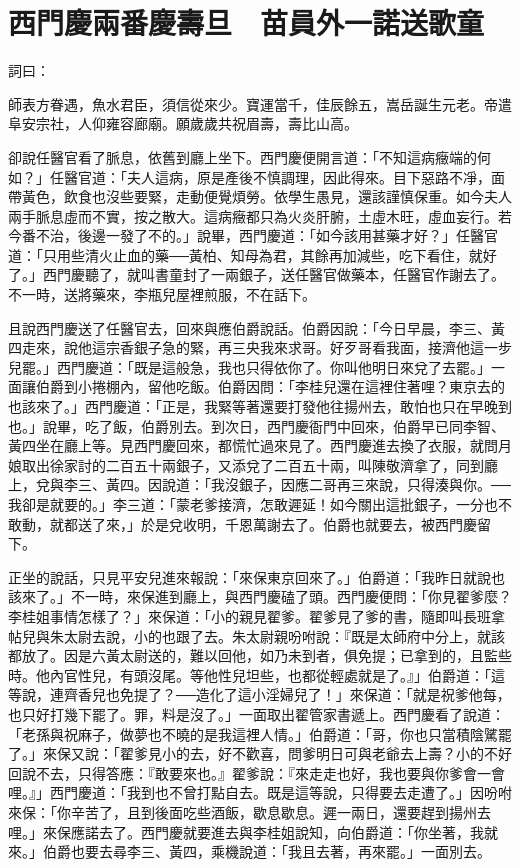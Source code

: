 %

\chapter{西門慶兩番慶壽旦　苗員外一諾送歌童}

詞曰：

師表方眷遇，魚水君臣，須信從來少。寶運當千，佳辰餘五，嵩岳誕生元老。帝遣阜安宗社，人仰雍容廊廟。願歲歲共祝眉壽，壽比山高。

卻說任醫官看了脈息，依舊到廳上坐下。西門慶便開言道：「不知這病癥端的何如？」任醫官道：「夫人這病，原是產後不慎調理，因此得來。目下惡路不凈，面帶黃色，飲食也沒些要緊，走動便覺煩勞。依學生愚見，還該謹慎保重。如今夫人兩手脈息虛而不實，按之散大。這病癥都只為火炎肝腑，土虛木旺，虛血妄行。若今番不治，後邊一發了不的。」說畢，西門慶道：「如今該用甚藥才好？」任醫官道：「只用些清火止血的藥──黃柏、知母為君，其餘再加減些，吃下看住，就好了。」西門慶聽了，就叫書童封了一兩銀子，送任醫官做藥本，任醫官作謝去了。不一時，送將藥來，李瓶兒屋裡煎服，不在話下。

且說西門慶送了任醫官去，回來與應伯爵說話。伯爵因說：「今日早晨，李三、黃四走來，說他這宗香銀子急的緊，再三央我來求哥。好歹哥看我面，接濟他這一步兒罷。」西門慶道：「既是這般急，我也只得依你了。你叫他明日來兌了去罷。」一面讓伯爵到小捲棚內，留他吃飯。伯爵因問：「李桂兒還在這裡住著哩？東京去的也該來了。」西門慶道：「正是，我緊等著還要打發他往揚州去，敢怕也只在早晚到也。」說畢，吃了飯，伯爵別去。到次日，西門慶衙門中回來，伯爵早已同李智、黃四坐在廳上等。見西門慶回來，都慌忙過來見了。西門慶進去換了衣服，就問月娘取出徐家討的二百五十兩銀子，又添兌了二百五十兩，叫陳敬濟拿了，同到廳上，兌與李三、黃四。因說道：「我沒銀子，因應二哥再三來說，只得湊與你。──我卻是就要的。」李三道：「蒙老爹接濟，怎敢遲延！如今關出這批銀子，一分也不敢動，就都送了來，」於是兌收明，千恩萬謝去了。伯爵也就要去，被西門慶留下。

正坐的說話，只見平安兒進來報說：「來保東京回來了。」伯爵道：「我昨日就說也該來了。」不一時，來保進到廳上，與西門慶磕了頭。西門慶便問：「你見翟爹麼？李桂姐事情怎樣了？」來保道：「小的親見翟爹。翟爹見了爹的書，隨即叫長班拿帖兒與朱太尉去說，小的也跟了去。朱太尉親吩咐說：『既是太師府中分上，就該都放了。因是六黃太尉送的，難以回他，如乃未到者，俱免提；已拿到的，且監些時。他內官性兒，有頭沒尾。等他性兒坦些，也都從輕處就是了。』」伯爵道：「這等說，連齊香兒也免提了？──造化了這小淫婦兒了！」來保道：「就是祝爹他每，也只好打幾下罷了。罪，料是沒了。」一面取出翟管家書遞上。西門慶看了說道：「老孫與祝麻子，做夢也不曉的是我這裡人情。」伯爵道：「哥，你也只當積陰騭罷了。」來保又說：「翟爹見小的去，好不歡喜，問爹明日可與老爺去上壽？小的不好回說不去，只得答應：『敢要來也。』翟爹說：『來走走也好，我也要與你爹會一會哩。』」西門慶道：「我到也不曾打點自去。既是這等說，只得要去走遭了。」因吩咐來保：「你辛苦了，且到後面吃些酒飯，歇息歇息。遲一兩日，還要趕到揚州去哩。」來保應諾去了。西門慶就要進去與李桂姐說知，向伯爵道：「你坐著，我就來。」伯爵也要去尋李三、黃四，乘機說道：「我且去著，再來罷。」一面別去。

